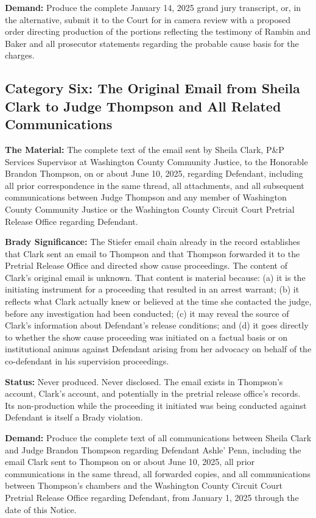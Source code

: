 \documentclass[12pt,letterpaper]{extarticle}
\begin{document}
\textbf{Demand:} Produce the complete January 14, 2025 grand jury transcript,
or, in the alternative, submit it to the Court for in camera review with a
proposed order directing production of the portions reflecting the testimony
of Rambin and Baker and all prosecutor statements regarding the probable cause
basis for the charges.

\subsection{Category Six: The Original Email from Sheila Clark to Judge Thompson
and All Related Communications}

\textbf{The Material:} The complete text of the email sent by Sheila Clark,
P\&P Services Supervisor at Washington County Community Justice, to the Honorable
Brandon Thompson, on or about June 10, 2025, regarding Defendant, including all
prior correspondence in the same thread, all attachments, and all subsequent
communications between Judge Thompson and any member of Washington County Community
Justice or the Washington County Circuit Court Pretrial Release Office regarding
Defendant.

\textbf{Brady Significance:} The Stiefer email chain already in the record
establishes that Clark sent an email to Thompson and that Thompson forwarded it to
the Pretrial Release Office and directed show cause proceedings. The content of
Clark's original email is unknown. That content is material because: (a) it is the
initiating instrument for a proceeding that resulted in an arrest warrant; (b) it
reflects what Clark actually knew or believed at the time she contacted the judge,
before any investigation had been conducted; (c) it may reveal the source of
Clark's information about Defendant's release conditions; and (d) it goes directly
to whether the show cause proceeding was initiated on a factual basis or on
institutional animus against Defendant arising from her advocacy on behalf of the
co-defendant in his supervision proceedings.

\textbf{Status:} Never produced. Never disclosed. The email exists in Thompson's
account, Clark's account, and potentially in the pretrial release office's records.
Its non-production while the proceeding it initiated was being conducted against
Defendant is itself a Brady violation.

\textbf{Demand:} Produce the complete text of all communications between Sheila
Clark and Judge Brandon Thompson regarding Defendant Ashle' Penn, including the
email Clark sent to Thompson on or about June 10, 2025, all prior communications
in the same thread, all forwarded copies, and all communications between Thompson's
chambers and the Washington County Circuit Court Pretrial Release Office regarding
Defendant, from January 1, 2025 through the date of this Notice.
\end{document}
